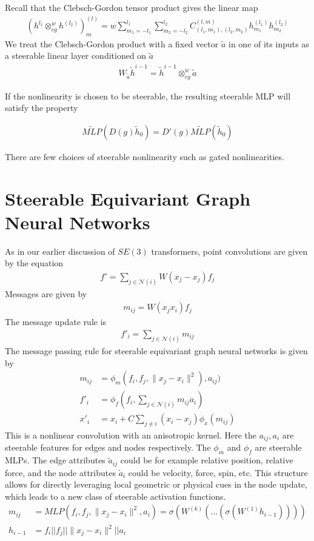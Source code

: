 \documentclass[book.tex]{subfiles}
\begin{document}
Recall that the Clebsch-Gordon tensor product gives the linear map
\begin{align}
    (h^{l_1} \otimes^w_{cg} h^{(l_2)})^{(l)}_m = w \sum_{m_1=-l_1}^{l_1} \sum_{m_2 = -l_2}^{l_2} C^{(l,m)}_{(l_1,m_1),(l_2, m_2)} h^{(l_1)}_{m_1}h^{(l_2)}_{m_2}
\end{align}
We treat the Clebsch-Gordon product with a fixed vector $\tilde{a}$ in one of its inputs as a steerable linear layer conditioned on $\tilde{a}$
\begin{align}
W_{\tilde{a}}\tilde{h}^{i-1} = \tilde{h}^{i-1} \otimes_{cg}^{w} \tilde{a}
\end{align}

If the nonlinearity is chosen to be steerable, the resulting steerable MLP will satisfy the property

\begin{align}
    \tilde{MLP}(D(g)\tilde{h}_0) = D'(g) \tilde{MLP}(\tilde{h}_0)
\end{align}

There are few choices of steerable nonlinearity such as gated nonlinearities.

\section{Steerable Equivariant Graph Neural Networks}

As in our earlier discussion of $SE(3)$ transformers, point convolutions are given by the equation
\begin{align}
    f' = \sum_{j \in \mathcal{N}(i)} W(x_j - x_j) f_j
\end{align}
Messages are given by
\begin{align}
    m_{ij} = W(x_j x_i)f_j
\end{align}
The message update rule is
\begin{align}
    f'_i = \sum_{j\in\mathcal{N}(i)} m_{ij}
\end{align}
The message passing rule for steerable equivariant graph neural networks is given by
\begin{align}
    m_{ij} &= \phi_m(f_i,f_j,\|x_j-x_i\|^2), a_{ij}) \\
    f'_i &= \phi_f(f_i, \sum_{j \in \mathcal{N}(i)} m_{ij} a_i) \\
    x'_i &= x_i + C \sum_{j\neq i} (x_i - x_j) \phi_x(m_{ij})
\end{align}
This is a nonlinear convolution with an anisotropic kernel. Here the $a_{ij}, a_i$ are steerable features for edges and nodes respectively. The $\phi_m$ and $\phi_f$ are steerable MLPs. The edge attributes $\tilde{a}_{ij}$ could be for example relative position, relative force, and the node attributes $\tilde{a}_i$ could be velocity, force, spin, etc. This structure allows for directly leveraging local geometric or physical cues in the node update, which leads to a new class of steerable activation functions.
\begin{align}
    m_{ij} &= MLP(f_i, f_j, \|x_j-x_i\|^2, a_i) = \sigma(W^{(k)}(\dotsc(\sigma(W^{(1)}h_{i-1})))) \\
    h_{i-1} &= f_i || f_j || \|x_j - x_i\|^2 || a_i
\end{align}
\end{document}
